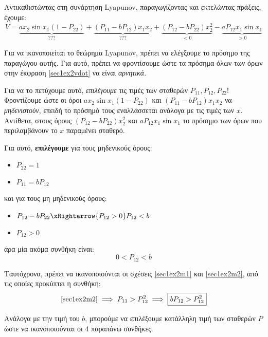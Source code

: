 \documentclass[11pt,a4paper,notitlepage,fleqn]{article}
\begin{document}
\begin{exercise}
	Αντικαθιστώντας στη συνάρτηση Lyapunov, παραγωγίζοντας και εκτελώντας πράξεις, έχουμε:
	\begin{equation}
	\dot V =
	\underbrace{ax_2\sin x_1\left( 1-P_{22} \right)}_{???} + \underbrace{(P_{11} - bP_{12})x_1x_2}_{???}
	+ \underbrace{(P_{12}-bP_{22})x_2^2}_{<0} -\underbrace{aP_{12}x_1\sin x_1}_{>0}
	\label{sec1ex2vdot}
	\end{equation}

	Για να ικανοποιείται το θεώρημα Lyapunov, πρέπει να ελέγξουμε το πρόσημο της
	παραγώγου αυτής. Για αυτό, πρέπει να φροντίσουμε ώστε τα πρόσημα όλων των
	όρων στην έκφραση \eqref{sec1ex2vdot} να είναι \textit{αρνητικά}.

	Για να το πετύχουμε αυτό, \textit{επιλέγουμε} τις τιμές των σταθερών
	\( P_{11},P_{12},P_{22} \)! Φροντίζουμε ώστε οι όροι \( ax_2\sin x_1(1-P_{22}) \)
	και \( (P_{11}-bP_{12})x_1x_2 \) να \textit{μηδενιστούν}, επειδή το πρόσημό τους
	εναλλάσσεται ανάλογα με τις τιμές των \( x \). Αντίθετα, στους όρους
	\( (P_{12}-bP_{22})x_2^2 \) και \( aP_{12}x_1\sin x_1 \) το πρόσημο των όρων
	που περιλαμβάνουν το \( x \) παραμένει σταθερό.

	Για αυτό, \textbf{επιλέγουμε} για τους μηδενικούς όρους:
	\begin{itemize}
		\item \( \boxed{P_{22} = 1 }\)
		\item \( \boxed{P_{11} = bP_{12}} \)
	\end{itemize}
	και για τους μη μηδενικούς όρους:
	\begin{itemize}
		\item \( P_{12} - bP_{22} \xRightarrow{P_{12} > 0} P_{12} < b \)
		\item \( P_{12} > 0 \)
	\end{itemize}
	άρα μία ακόμα συνθήκη είναι:
	\[
	\boxed{0 < P_{12} < b}
	\]

	Ταυτόχρονα, πρέπει να ικανοποιούνται οι σχέσεις \eqref{sec1ex2m1} και \eqref{sec1ex2m2}, από τις οποίες προκύπτει η συνθήκη:
	\[
	\eqref{sec1ex2m2} \implies P_{11} > P_{12}^2
	\implies \boxed{bP_{12} > P_{12}^2}
	\]

	Ανάλογα με την τιμή του \( b \), μπορούμε να επιλέξουμε κατάλληλη τιμή των
	σταθερών \( P \) ώστε να ικανοποιούνται οι 4 παραπάνω συνθήκες.
\end{exercise}
\end{document}
